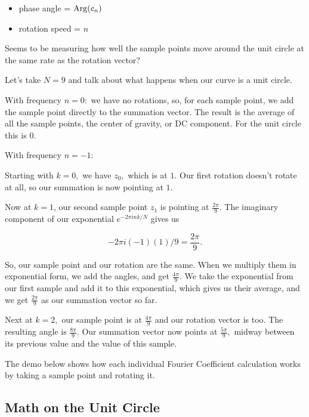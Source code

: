 \documentclass{article}
\begin{document}
\begin{itemize}
\item phase angle = $\operatorname{Arg}(c_n)$
\end{itemize}

\begin{itemize}
\item rotation speed = $n$ 
\end{itemize}

Seems to be measuring how well the sample points move around the unit circle at the same rate as the rotation vector?

Let's take $N = 9$ and talk about what happens when our curve is a unit circle.

With frequency $n=0:$ we have no rotations, so, for each sample point, we add the sample point directly to the summation vector. The result is the average of all the sample points, the center of gravity, or DC component. For the unit circle this is $0.$

With frequency $n=-1:$

Starting with $k=0, $ we have $z_0,$ which is at $1.$ Our first rotation doesn't rotate at all, so our summation is now pointing at $1.$

Now at $k=1$, our second sample point $z_1$ is pointing at $\frac{2 \pi}{9}.$ The imaginary component of our exponential $e^{-2 \pi i n k / N}$ gives us

\[ -2 \pi i (-1) (1) / 9 = \frac{2 \pi}{9}. \]

So, our sample point and our rotation are the same. When we multiply them in exponential form, we add the angles, and get $\frac{4 \pi}{9}.$ We take the exponential from our first sample and add it to this exponential, which gives us their average, and we get $\frac{2 \pi}{9}$ as our summation vector so far.

Next at $k=2,$ our sample point is at $\frac{4 \pi}{9}$ and our rotation vector is too. The resulting angle is $\frac{8 \pi}{9}.$ Our summation vector now points at $\frac{5 \pi}{9},$ midway between its previous value and the value of this sample.

The demo below shows how each individual Fourier Coefficient calculation works by taking a sample point and rotating it.


\subsection{Math on the Unit Circle}
\end{document}
